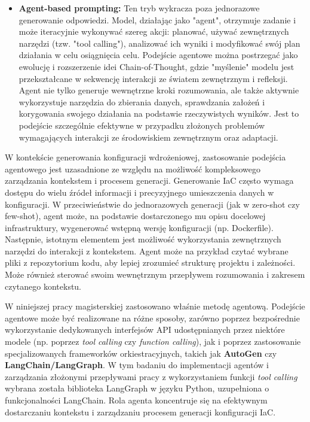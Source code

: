 \begin{itemize}
	\item \textbf{Agent-based prompting:} Ten tryb wykracza poza jednorazowe generowanie odpowiedzi. Model, działając jako "agent", otrzymuje zadanie i może iteracyjnie wykonywać szereg akcji: planować, używać zewnętrznych narzędzi (tzw. "tool calling"), analizować ich wyniki i modyfikować swój plan działania w celu osiągnięcia celu. Podejście agentowe można postrzegać jako ewolucję i rozszerzenie idei Chain-of-Thought, gdzie "myślenie" modelu jest przekształcane w sekwencję interakcji ze światem zewnętrznym i refleksji. Agent nie tylko generuje wewnętrzne kroki rozumowania, ale także aktywnie wykorzystuje narzędzia do zbierania danych, sprawdzania założeń i korygowania swojego działania na podstawie rzeczywistych wyników. Jest to podejście szczególnie efektywne w przypadku złożonych problemów wymagających interakcji ze środowiskiem zewnętrznym oraz adaptacji.
\end{itemize}

W kontekście generowania konfiguracji wdrożeniowej, zastosowanie podejścia agentowego jest uzasadnione ze względu na możliwość kompleksowego zarządzania kontekstem i procesem generacji. Generowanie IaC często wymaga dostępu do wielu źródeł informacji i precyzyjnego umieszczenia danych w konfiguracji. W przeciwieństwie do jednorazowych generacji (jak w zero-shot czy few-shot), agent może, na podstawie dostarczonego mu opisu docelowej infrastruktury, wygenerować wstępną wersję konfiguracji (np. Dockerfile). Następnie, istotnym elementem jest możliwość wykorzystania zewnętrznych narzędzi do interakcji z kontekstem. Agent może na przykład czytać wybrane pliki z repozytorium kodu, aby lepiej zrozumieć strukturę projektu i zależności. Może również sterować swoim wewnętrznym przepływem rozumowania i zakresem czytanego kontekstu.

W niniejszej pracy magisterskiej zastosowano właśnie metodę agentową. Podejście agentowe może być realizowane na różne sposoby, zarówno poprzez bezpośrednie wykorzystanie dedykowanych interfejsów API udostępnianych przez niektóre modele (np. poprzez \textit{tool calling} czy \textit{function calling}), jak i poprzez zastosowanie specjalizowanych frameworków orkiestracyjnych, takich jak \textbf{AutoGen} \cite{autogen} czy \textbf{LangChain/LangGraph}. W tym badaniu do implementacji agentów i zarządzania złożonymi przepływami pracy z wykorzystaniem funkcji \textit{tool calling} wybrana została biblioteka LangGraph w języku Python, uzupełniona o funkcjonalności LangChain. Rola agenta koncentruje się na efektywnym dostarczaniu kontekstu i zarządzaniu procesem generacji konfiguracji IaC.


